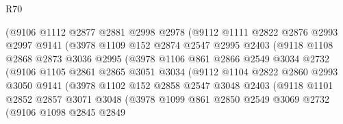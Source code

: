 \begin{lexlean}{R70}
\begin{coremodule}
                    (@9106
                      @1112
                      @2877
                      @2881
                      @2998
                      @2978
                      (@9112
                        @1111
                        @2822
                        @2876
                        @2993
                        @2997
                        @9141
                        (@3978
                          @1109
                          @152
                          @2874
                          @2547
                          @2995
                          @2403
                          (@9118
                            @1108
                            @2868
                            @2873
                            @3036
                            @2995
                            (@3978
                              @1106
                              @861
                              @2866
                              @2549
                              @3034
                              @2732
                              (@9106
                                @1105
                                @2861
                                @2865
                                @3051
                                @3034
                                (@9112
                                  @1104
                                  @2822
                                  @2860
                                  @2993
                                  @3050
                                  @9141
                                  (@3978
                                    @1102
                                    @152
                                    @2858
                                    @2547
                                    @3048
                                    @2403
                                    (@9118
                                      @1101
                                      @2852
                                      @2857
                                      @3071
                                      @3048
                                      (@3978
                                        @1099
                                        @861
                                        @2850
                                        @2549
                                        @3069
                                        @2732
                                        (@9106
                                          @1098
                                          @2845
                                          @2849

\end{coremodule}
\end{lexlean}
